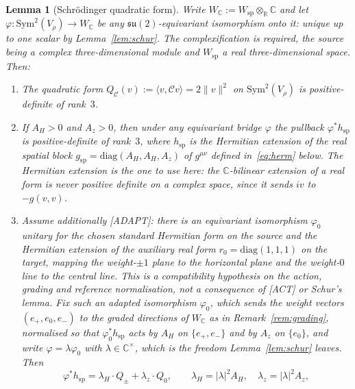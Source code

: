 \documentclass[11pt,a4paper]{article}
\newtheorem{lemma}[theorem]{Lemma}
\newcommand{\su}{\mathfrak{su}}
\newcommand{\Vr}{V_\rho}
\newcommand{\Sym}{\mathrm{Sym}}
\begin{document}
    \begin{lemma}[Schr\"{o}dinger quadratic form]
      \label{lem:qform}
      Write $W_\mathbb{C} := W_{\mathrm{sp}} \otimes_\mathbb{R} \mathbb{C}$ and let
      $\varphi : \Sym^2(\Vr) \to W_\mathbb{C}$
      be any $\su(2)$-equivariant isomorphism onto it: unique up to one scalar by
      Lemma~\ref{lem:schur}.
      The complexification is required, the source being a complex three-dimensional module and
      $W_{\mathrm{sp}}$ a real three-dimensional space.
      Then:
      \begin{enumerate}
        \item The quadratic form $Q_{\mathcal{C}}(v) := \langle v, \mathcal{C} v \rangle = 2\|v\|^2$
        on $\Sym^2(\Vr)$ is positive-definite of rank~$3$.
        \item If $A_H > 0$ and $A_z > 0$, then under any equivariant bridge $\varphi$ the pullback
        $\varphi^* h_{\mathrm{sp}}$ is positive-definite of rank~$3$, where $h_{\mathrm{sp}}$ is the
        Hermitian extension of the real spatial block
        $g_{\mathrm{sp}} = \mathrm{diag}(A_H, A_H, A_z)$ of $g^{\mu\nu}$ defined
        in~\eqref{eq:herm} below.
        The Hermitian extension is the one to use here: the $\mathbb{C}$-bilinear extension of a
        real form is never positive definite on a complex space, since it sends $iv$ to
        $-g(v,v)$.
        \item Assume additionally [ADAPT]: there is an equivariant isomorphism $\varphi_0$
        unitary for the chosen standard Hermitian form on the source and the Hermitian extension
        of the auxiliary real form $r_0=\mathrm{diag}(1,1,1)$ on the target, mapping the
        weight-$\pm1$ plane to the horizontal plane and the weight-$0$ line to the central line.
        This is a compatibility hypothesis on the action, grading and reference normalisation,
        not a consequence of [ACT] or Schur's lemma.
        Fix such an adapted isomorphism $\varphi_0$, which sends the weight vectors
        $(e_+, e_0, e_-)$ to the graded directions of $W_\mathbb{C}$ as in
        Remark~\ref{rem:grading}, normalised so that $\varphi_0^* h_{\mathrm{sp}}$ acts by $A_H$ on
        $\{e_+, e_-\}$ and by $A_z$ on $\{e_0\}$, and write $\varphi = \lambda\varphi_0$ with
        $\lambda \in \mathbb{C}^\times$, which is the freedom Lemma~\ref{lem:schur} leaves.
        Then
        \begin{equation}
          \varphi^* h_{\mathrm{sp}} = \lambda_H \cdot Q_{\pm} + \lambda_z \cdot Q_0,
          \qquad \lambda_H = |\lambda|^2 A_H, \quad \lambda_z = |\lambda|^2 A_z,

\end{equation}
\end{enumerate}
\end{lemma}
\end{document}
